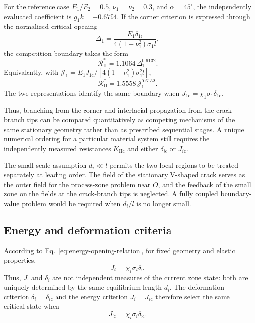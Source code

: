 \documentclass[pdflatex,onecolumn,sn-mathphys-ay]{sn-jnl}
\begin{document}
For the reference case
$E_1/E_2=0.5$, $\nu_1=\nu_2=0.3$, and
$\alpha=45^\circ$, the independently evaluated coefficient is
$g_1k=-0.6794$. If the corner criterion is expressed through the normalized
critical opening
\begin{equation*}
  \Delta_1=
  \frac{E_1\delta_{1\mathrm{c}}}
  {4(1-\nu_1^2)\sigma_1l},
\end{equation*}
the competition boundary takes the form
\begin{equation*}
  \mathcal R_{\mathrm{II}}^*
  =1.1064\,\Delta_1^{0.6132}.
\end{equation*}
Equivalently, with
$\mathcal J_1=E_1J_{1\mathrm{c}}/
[4(1-\nu_1^2)\sigma_1^2l]$,
\begin{equation*}
  \mathcal R_{\mathrm{II}}^*
  =1.5558\,\mathcal J_1^{0.6132}.
\end{equation*}
The two representations identify the same boundary when
$J_{1\mathrm{c}}=\chi_1\sigma_1\delta_{1\mathrm{c}}$.

Thus, branching from the corner and interfacial propagation from the
crack-branch tips can be compared quantitatively as competing mechanisms of
the same stationary geometry rather than as prescribed sequential stages. A unique
numerical ordering for a particular material system still requires the
independently measured resistances $K_{\mathrm{IIc}}$ and either
$\delta_{i\mathrm{c}}$ or $J_{i\mathrm{c}}$.

The small-scale assumption $d_i\ll l$ permits the two local regions to be
treated separately at leading order. The field of the stationary V-shaped
crack serves as the outer field for the process-zone problem near $O$, and
the feedback of the small zone on the fields at the crack-branch tips is
neglected. A fully coupled boundary-value problem would be required when
$d_i/l$ is no longer small.

\subsection{Energy and deformation criteria}
\label{subsec:discussion-criteria}

According to Eq.~\eqref{eq:energy-opening-relation}, for fixed geometry
and elastic properties,
\begin{equation*}
  J_i=\chi_i\sigma_i\delta_i.
\end{equation*}
Thus, $J_i$ and $\delta_i$ are not independent measures of the current
zone state: both are uniquely determined by the same equilibrium length
$d_i$. The deformation criterion
$\delta_i=\delta_{i\mathrm{c}}$ and the energy criterion
$J_i=J_{i\mathrm{c}}$ therefore select the same critical state when
\begin{equation*}
  J_{i\mathrm{c}}
  =\chi_i\sigma_i\delta_{i\mathrm{c}}.
\end{equation*}
\end{document}
